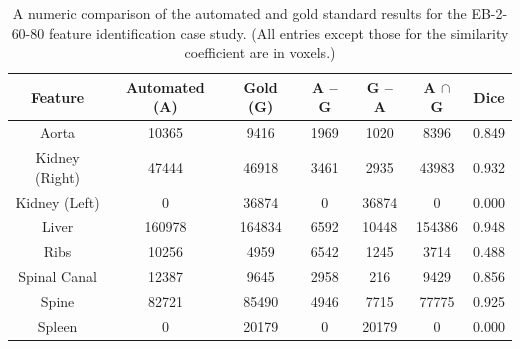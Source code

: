 \begin{table}[p]
\begin{center}
\begin{tabular}{c|cccccc}
\footnotesize \textbf{Feature} & \footnotesize \textbf{Automated (A)} & \footnotesize \textbf{Gold (G)} & \footnotesize \textbf{A -- G} & \footnotesize \textbf{G -- A} & \footnotesize \textbf{A $\cap$ G} & \footnotesize \textbf{Dice} \\
\hline
\footnotesize Aorta & \footnotesize 10365 & \footnotesize 9416 & \footnotesize 1969 & \footnotesize 1020 & \footnotesize 8396 & \footnotesize 0.849 \\
\footnotesize Kidney (Right) & \footnotesize 47444 & \footnotesize 46918 & \footnotesize 3461 & \footnotesize 2935 & \footnotesize 43983 & \footnotesize 0.932 \\
\footnotesize Kidney (Left) & \footnotesize 0 & \footnotesize 36874 & \footnotesize 0 & \footnotesize 36874 & \footnotesize 0 & \footnotesize 0.000 \\
\footnotesize Liver & \footnotesize 160978 & \footnotesize 164834 & \footnotesize 6592 & \footnotesize 10448 & \footnotesize 154386 & \footnotesize 0.948 \\
\footnotesize Ribs & \footnotesize 10256 & \footnotesize 4959 & \footnotesize 6542 & \footnotesize 1245 & \footnotesize 3714 & \footnotesize 0.488 \\
\footnotesize Spinal Canal & \footnotesize 12387 & \footnotesize 9645 & \footnotesize 2958 & \footnotesize 216 & \footnotesize 9429 & \footnotesize 0.856 \\
\footnotesize Spine & \footnotesize 82721 & \footnotesize 85490 & \footnotesize 4946 & \footnotesize 7715 & \footnotesize 77775 & \footnotesize 0.925 \\
\footnotesize Spleen & \footnotesize 0 & \footnotesize 20179 & \footnotesize 0 & \footnotesize 20179 & \footnotesize 0 & \footnotesize 0.000 \\
\end{tabular}
\end{center}
\caption{A numeric comparison of the automated and gold standard results for the EB-2-60-80 feature identification case study. (All entries except those for the similarity coefficient are in voxels.)}
\label{tbl:validation-EB-2-60-80}
\end{table}

